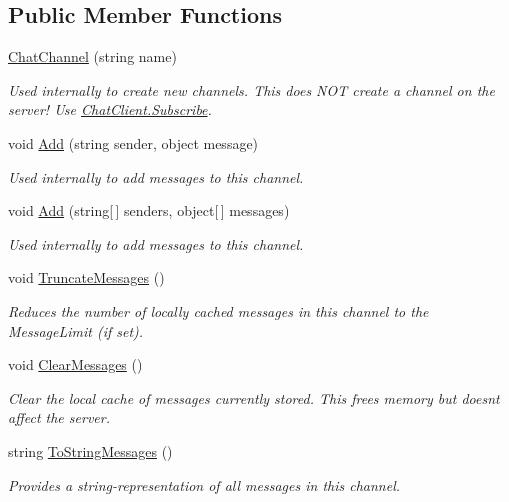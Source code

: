 \subsection*{Public Member Functions}
\begin{DoxyCompactItemize}
\item 
\hyperlink{class_exit_games_1_1_client_1_1_photon_1_1_chat_1_1_chat_channel_a2e1d1cb310690b115794661ffdbb68b2}{Chat\+Channel} (string name)
\begin{DoxyCompactList}\small\item\em Used internally to create new channels. This does N\+OT create a channel on the server! Use \hyperlink{class_exit_games_1_1_client_1_1_photon_1_1_chat_1_1_chat_client_aecfdac4a2de6577291597477bcaec9c7}{Chat\+Client.\+Subscribe}.\end{DoxyCompactList}\item 
void \hyperlink{class_exit_games_1_1_client_1_1_photon_1_1_chat_1_1_chat_channel_a17c00992e4bc685fbea02345c8e206cb}{Add} (string sender, object message)
\begin{DoxyCompactList}\small\item\em Used internally to add messages to this channel.\end{DoxyCompactList}\item 
void \hyperlink{class_exit_games_1_1_client_1_1_photon_1_1_chat_1_1_chat_channel_aa672474d138d6e1a4d7ef8c4ec616617}{Add} (string\mbox{[}$\,$\mbox{]} senders, object\mbox{[}$\,$\mbox{]} messages)
\begin{DoxyCompactList}\small\item\em Used internally to add messages to this channel.\end{DoxyCompactList}\item 
void \hyperlink{class_exit_games_1_1_client_1_1_photon_1_1_chat_1_1_chat_channel_a289e0448db95485404474b3702e80943}{Truncate\+Messages} ()
\begin{DoxyCompactList}\small\item\em Reduces the number of locally cached messages in this channel to the Message\+Limit (if set).\end{DoxyCompactList}\item 
void \hyperlink{class_exit_games_1_1_client_1_1_photon_1_1_chat_1_1_chat_channel_a837567f440a3174151eab88afb34d019}{Clear\+Messages} ()
\begin{DoxyCompactList}\small\item\em Clear the local cache of messages currently stored. This frees memory but doesn\textquotesingle{}t affect the server.\end{DoxyCompactList}\item 
string \hyperlink{class_exit_games_1_1_client_1_1_photon_1_1_chat_1_1_chat_channel_a6aee5506a39fd2a26113addf8287f31a}{To\+String\+Messages} ()
\begin{DoxyCompactList}\small\item\em Provides a string-\/representation of all messages in this channel. \end{DoxyCompactList}\end{DoxyCompactItemize}
